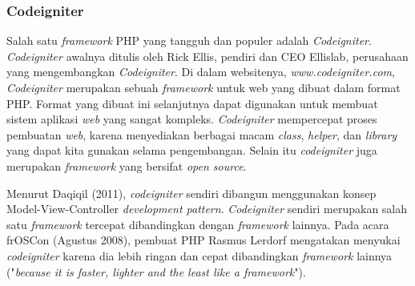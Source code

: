     \subsubsection{Codeigniter}
    Salah satu \emph{framework} PHP yang tangguh dan populer adalah \emph{Codeigniter}. \emph{Codeigniter} awalnya ditulis oleh Rick Ellis, pendiri dan CEO Ellislab, perusahaan yang mengembangkan \emph{Codeigniter}. Di dalam websitenya, \emph{www.codeigniter.com}, \emph{Codeigniter} merupakan sebuah \emph{framework} untuk web yang dibuat dalam format PHP. Format yang dibuat ini selanjutnya dapat digunakan untuk membuat sistem aplikasi \emph{web} yang sangat kompleks. \emph{Codeigniter} mempercepat proses pembuatan \emph{web}, karena menyediakan berbagai macam \emph{class}, \emph{helper}, dan \emph{library} yang dapat kita gunakan selama pengembangan. Selain itu \emph{codeigniter} juga merupakan \emph{framework} yang bersifat \emph{open source}.
    
    Menurut Daqiqil (2011), \emph{codeigniter} sendiri dibangun menggunakan konsep Model-View-Controller \emph{development pattern}. \emph{Codeigniter} sendiri merupakan salah satu \emph{framework} tercepat dibandingkan dengan \emph{framework} lainnya. Pada acara frOSCon (Agustus 2008), pembuat PHP Rasmus Lerdorf mengatakan menyukai \emph{codeigniter} karena dia lebih ringan dan cepat dibandingkan \emph{framework} lainnya ("\emph{because it is faster, lighter and the least like a framework}").
    
